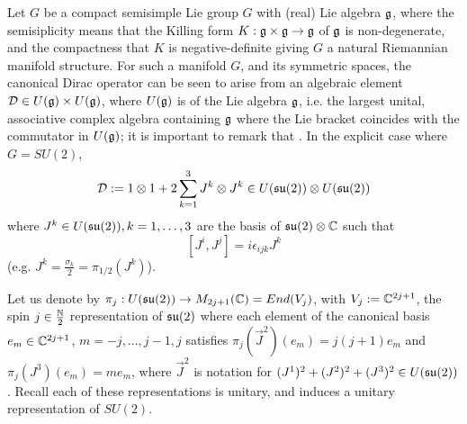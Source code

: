 Let $G$ be a compact semisimple Lie group $G$ with (real) Lie algebra $\mathfrak{g}$, where the semisiplicity means that the Killing form $K: \mathfrak{g} \times \mathfrak{g} \to \mathfrak{g}$ of $\mathfrak{g}$ is non-degenerate, and the compactness that $K$ is negative-definite giving $G$ a natural Riemannian manifold structure. For such a manifold $G$, and its symmetric spaces, the canonical Dirac operator can be seen to arise \cite{Huang2007} from an algebraic element $\textcolor{black}{\mathcal D } \in U(\mathfrak{g})\times U(\mathfrak{g})$, where $\textcolor{black}{U}(\mathfrak{g})$ is  of the Lie algebra $\mathfrak{g}$, i.e. the largest unital, associative complex algebra containing $\mathfrak{g}$ where the Lie bracket coincides with the commutator in $U(\mathfrak{g})$; it is important to remark that . In the explicit case where $G = SU(2)$,
\begin{equation}\label{equationALgebraicDiracOperatorDecomposition}
    \textcolor{black}{\mathcal D} := 1 \otimes 1 + 2 \sum_{k = 1}^3 J^k \otimes J^k \in U(\mathfrak{su}(2)) \otimes U(\mathfrak{su}(2))
\end{equation}
where $J^k \in U(\mathfrak{su}(2)), k = 1, \dots, 3$ are the basis of $\mathfrak{su}(2)\otimes \mathbb{C}$ such that 
\begin{equation}\label{equationCommutationRelationJs}
    [J^i, J^j] = i \epsilon_{ijk} J^k
\end{equation} (e.g. $J^k = \frac{\sigma_k}{2} = \pi_{1/2}(J^k)$). 

\lin

\begin{notation} \label{notRepSu2}
Let us denote by $\textcolor{black}{\pi_j}: U(\mathfrak{su}(2)) \to M_{2j+1}(\mathbb{C}) = End(V_j)$, with $V_j := \mathbb{C}^{2j+1}$, the spin $j \in \frac{\mathbb{N}}{2}$ representation of $\mathfrak{su}(2)$ where each element of the canonical basis $e_m \in \mathbb{C}^{2j+1}$, $m = -j, \dots, j-1, j$ satisfies $\pi_j(\vec J^2)(e_m) = j(j+1) e_m$ and $\pi_j(J^3)(e_m) = m e_m$, where $\vec J^2$ is notation for $(J^1)^2 + (J^2)^2 + (J^3)^2 \in U(\mathfrak{su}(2))$. Recall each of these representations is unitary, and induces a unitary representation of $SU(2)$.
\end{notation}
 
